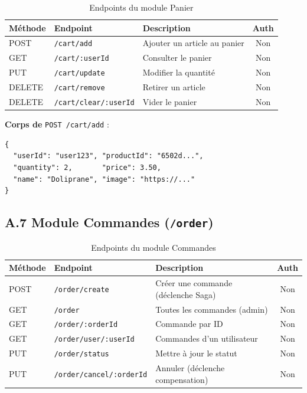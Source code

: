 \begin{table}[H]
    \centering
    \begin{tabular}{|l|l|p{5.5cm}|c|}
        \hline
        \textbf{Méthode} & \textbf{Endpoint} & \textbf{Description} & \textbf{Auth} \\
        \hline
        POST   & \texttt{/cart/add}            & Ajouter un article au panier   & Non \\
        GET    & \texttt{/cart/:userId}        & Consulter le panier            & Non \\
        PUT    & \texttt{/cart/update}         & Modifier la quantité           & Non \\
        DELETE & \texttt{/cart/remove}         & Retirer un article             & Non \\
        DELETE & \texttt{/cart/clear/:userId}  & Vider le panier                & Non \\
        \hline
    \end{tabular}
    \caption{Endpoints du module Panier}
\end{table}

\textbf{Corps de} \texttt{POST /cart/add} :
\begin{verbatim}
{
  "userId": "user123", "productId": "6502d...",
  "quantity": 2,       "price": 3.50,
  "name": "Doliprane", "image": "https://..."
}
\end{verbatim}

\subsection*{A.7 Module Commandes (\texttt{/order})}

\begin{table}[H]
    \centering
    \begin{tabular}{|l|l|p{5cm}|c|}
        \hline
        \textbf{Méthode} & \textbf{Endpoint} & \textbf{Description} & \textbf{Auth} \\
        \hline
        POST & \texttt{/order/create}         & Créer une commande (déclenche Saga) & Non \\
        GET  & \texttt{/order}                & Toutes les commandes (admin)        & Non \\
        GET  & \texttt{/order/:orderId}       & Commande par ID                     & Non \\
        GET  & \texttt{/order/user/:userId}   & Commandes d'un utilisateur          & Non \\
        PUT  & \texttt{/order/status}         & Mettre à jour le statut             & Non \\
        PUT  & \texttt{/order/cancel/:orderId}& Annuler (déclenche compensation)    & Non \\
        \hline
    \end{tabular}
    \caption{Endpoints du module Commandes}
\end{table}

